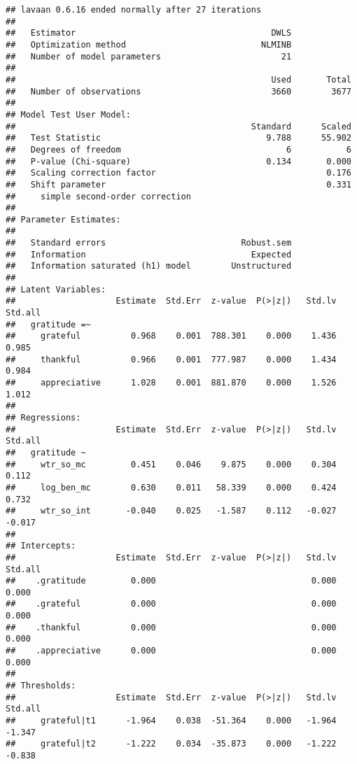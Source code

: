 \documentclass[
]{article}
\begin{document}
\begin{verbatim}
## lavaan 0.6.16 ended normally after 27 iterations
## 
##   Estimator                                       DWLS
##   Optimization method                           NLMINB
##   Number of model parameters                        21
## 
##                                                   Used       Total
##   Number of observations                          3660        3677
## 
## Model Test User Model:
##                                               Standard      Scaled
##   Test Statistic                                 9.788      55.902
##   Degrees of freedom                                 6           6
##   P-value (Chi-square)                           0.134       0.000
##   Scaling correction factor                                  0.176
##   Shift parameter                                            0.331
##     simple second-order correction                                
## 
## Parameter Estimates:
## 
##   Standard errors                           Robust.sem
##   Information                                 Expected
##   Information saturated (h1) model        Unstructured
## 
## Latent Variables:
##                    Estimate  Std.Err  z-value  P(>|z|)   Std.lv  Std.all
##   gratitude =~                                                          
##     grateful          0.968    0.001  788.301    0.000    1.436    0.985
##     thankful          0.966    0.001  777.987    0.000    1.434    0.984
##     appreciative      1.028    0.001  881.870    0.000    1.526    1.012
## 
## Regressions:
##                    Estimate  Std.Err  z-value  P(>|z|)   Std.lv  Std.all
##   gratitude ~                                                           
##     wtr_so_mc         0.451    0.046    9.875    0.000    0.304    0.112
##     log_ben_mc        0.630    0.011   58.339    0.000    0.424    0.732
##     wtr_so_int       -0.040    0.025   -1.587    0.112   -0.027   -0.017
## 
## Intercepts:
##                    Estimate  Std.Err  z-value  P(>|z|)   Std.lv  Std.all
##    .gratitude         0.000                               0.000    0.000
##    .grateful          0.000                               0.000    0.000
##    .thankful          0.000                               0.000    0.000
##    .appreciative      0.000                               0.000    0.000
## 
## Thresholds:
##                    Estimate  Std.Err  z-value  P(>|z|)   Std.lv  Std.all
##     grateful|t1      -1.964    0.038  -51.364    0.000   -1.964   -1.347
##     grateful|t2      -1.222    0.034  -35.873    0.000   -1.222   -0.838

\end{verbatim}
\end{document}
